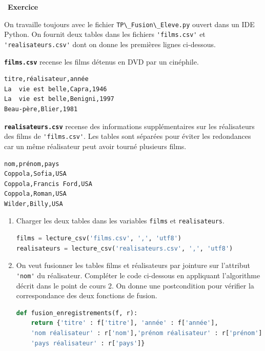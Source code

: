 \documentclass[
  11pt,
]{article}
\newcommand{\passthrough}[1]{#1}
\newcounter{exo}
\newenvironment{exercice}[1]
{\par \medskip   \addtocounter{exo}{1} \noindent  
\begin{bclogo}[arrondi =0.1,   noborder = true, logo=\bccrayon, marge=4]{~\textbf{Exercice} \textbf{\theexo} {\itshape #1} }  \par}
{
\end{bclogo}
 \par \bigskip }
\newcounter{thme}
\newcounter{def}
\newcounter{cours}
\newcounter{alg}
\begin{document}
\begin{exercice}{}

On travaille toujours avec le fichier
\passthrough{\lstinline!TP\_Fusion\_Eleve.py!} ouvert dans un IDE
Python. On fournit deux tables dans les fichiers
\passthrough{\lstinline!'films.csv'!} et
\passthrough{\lstinline!'realisateurs.csv'!} dont on donne les premières
lignes ci-dessous.

\textbf{\passthrough{\lstinline!films.csv!}} recense les films détenus
en DVD par un cinéphile.

\begin{lstlisting}
titre,réalisateur,année
La  vie est belle,Capra,1946
La  vie est belle,Benigni,1997
Beau-père,Blier,1981
\end{lstlisting}

\textbf{\passthrough{\lstinline!realisateurs.csv!}} recense des
informations supplémentaires sur les réalisateurs des films de
\passthrough{\lstinline!'films.csv'!}. Les tables sont séparées pour
éviter les redondances car un même réalisateur peut avoir tourné
plusieurs films.

\begin{lstlisting}
nom,prénom,pays
Coppola,Sofia,USA
Coppola,Francis Ford,USA
Coppola,Roman,USA
Wilder,Billy,USA
\end{lstlisting}

\begin{enumerate}
\def\labelenumi{\arabic{enumi}.}
\item
  Charger les deux tables dans les variables
  \passthrough{\lstinline!films!} et
  \passthrough{\lstinline!realisateurs!}.

\begin{lstlisting}[language=Python]
films = lecture_csv('films.csv', ',', 'utf8')
realisateurs = lecture_csv('realisateurs.csv', ',', 'utf8')
\end{lstlisting}
\item
  On veut fusionner les tables films et réalisateurs par jointure sur
  l'attribut \passthrough{\lstinline!'nom'!} du réalisateur. Compléter
  le code ci-dessous en appliquant l'algorithme décrit dans le point de
  cours 2. On donne une postcondition pour vérifier la correspondance
  des deux fonctions de fusion.

\begin{lstlisting}[language=Python]
def fusion_enregistrements(f, r):
    return {'titre' : f['titre'], 'année' : f['année'], 
    'nom réalisateur' : r['nom'],'prénom réalisateur' : r['prénom'],
    'pays réalisateur' : r['pays']}


\end{lstlisting}
\end{enumerate}
\end{exercice}
\end{document}

